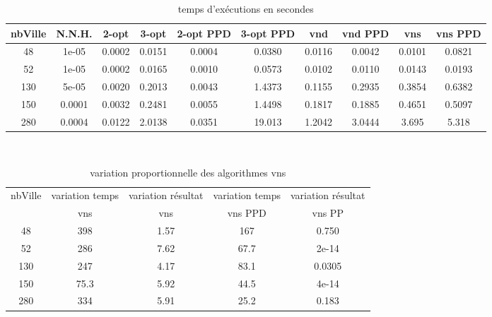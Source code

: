 \documentclass[12pt,a4paper]{article}
\begin{document}
\begin{table}[!h]
\centering
\begin{tabular}{|*{10}{c|}}
  \hline
  nbVille & N.N.H. & 2-opt & 3-opt & 2-opt PPD & 3-opt PPD & vnd & vnd PPD & vns & vns PPD \\
  \hline
  48 & 1e-05 & 0.0002 & 0.0151 & 0.0004 & 0.0380 & 0.0116 & 0.0042 & 0.0101 & 0.0821 \\
  52 & 1e-05 & 0.0002 & 0.0165 & 0.0010 & 0.0573 & 0.0102 & 0.0110 & 0.0143 & 0.0193 \\
  130 & 5e-05 & 0.0020 & 0.2013 & 0.0043 & 1.4373 & 0.1155 & 0.2935 & 0.3854 & 0.6382 \\
  150 & 0.0001 & 0.0032 & 0.2481 & 0.0055 & 1.4498 & 0.1817 & 0.1885 & 0.4651 & 0.5097 \\
  280 & 0.0004 & 0.0122 & 2.0138 & 0.0351 & 19.013 & 1.2042 & 3.0444 & 3.695 & 5.318 \\ 
  \hline
\end{tabular}
\caption{temps d’exécutions en secondes}
\label{NNHtemps}
\end{table}
~\\
\begin{table}[!h]
\centering
\begin{tabular}{|*{5}{c|}}
  \hline
  nbVille & variation temps & variation résultat & variation temps & variation résultat \\
  ~ & vns & vns & vns PPD & vns PP \\
  \hline
  48 & 398 & 1.57 & 167 & 0.750 \\ 
  52 & 286 & 7.62 & 67.7 & 2e-14 \\
  130 & 247 & 4.17 & 83.1 & 0.0305 \\
  150 & 75.3 & 5.92 & 44.5 & 4e-14 \\
  280 & 334 & 5.91 & 25.2 & 0.183 \\
  \hline
\end{tabular}
\caption{variation proportionnelle des algorithmes vns}
\label{variationvnsNNH}
\end{table}
~\\
\end{document}
